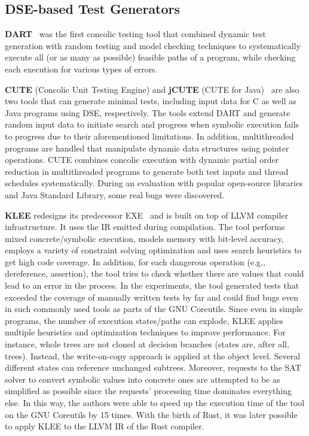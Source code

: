 \documentclass{article}
\begin{document}
\subsection{DSE-based Test Generators}
\textbf{DART}~\cite{Godefroid_2005} was the first concolic testing tool that combined dynamic test generation with random testing and model checking techniques to systematically execute all (or as many as possible) feasible paths of a program, while checking each execution for various types of errors. 


\textbf{CUTE} (Concolic Unit Testing Engine) and \textbf{jCUTE} (CUTE for Java)~\cite{Sen2006} are also two tools that can generate minimal tests, including input data for C as well as Java programs using \ac{DSE}, respectively. The tools extend DART and generate random input data to initiate search and progress when symbolic execution fails to progress due to their aforementioned limitations. In addition, multithreaded programs are handled that manipulate dynamic data structures using pointer operations. CUTE combines concolic execution with dynamic partial order reduction in multithreaded programs to generate both test inputs and thread schedules systematically. During an evaluation with popular open-source libraries and Java Standard Library, some real bugs were discovered. 


\textbf{KLEE} redesigns its predecessor EXE~\cite{Cadar2008} and is built on top of LLVM compiler infrastructure. It uses the \ac{IR} emitted during compilation. The tool performs mixed concrete/symbolic execution, models memory with bit-level accuracy, employs a variety of constraint solving optimization and uses search heuristics to get high code coverage. In addition, for each dangerous operation (e.g., dereference, assertion), the tool tries to check whether there are values that could lead to an error in the process. In the experiments, the tool generated tests that exceeded the coverage of manually written tests by far and could find bugs even in such commonly used tools as parts of the GNU Coreutils. Since even in simple programs, the number of execution states/paths can explode, KLEE applies multiple heuristics and optimization techniques to improve performance. For instance, whole trees are not cloned at decision branches (states are, after all, trees). Instead, the write-on-copy approach is applied at the object level. Several different states can reference unchanged subtrees. Moreover, requests to the SAT solver to convert symbolic values into concrete ones are attempted to be as simplified as possible since the requests' processing time dominates everything else. In this way, the authors were able to speed up the execution time of the tool on the GNU Coreutils by 15 times. With the birth of Rust, it was later possible to apply KLEE to the LLVM IR of the Rust compiler. 
\end{document}
